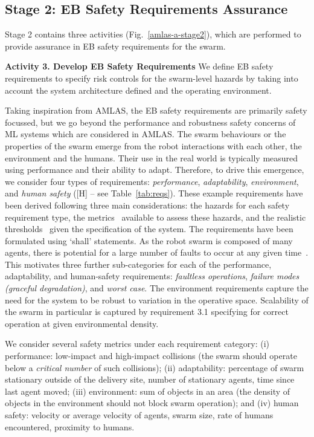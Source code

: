 \documentclass[runningheads]{llncs}
\begin{document}
	\subsection{Stage 2: EB Safety Requirements Assurance} \label{framework-stage2}
	Stage 2 contains three activities (Fig.~\ref{amlas-a-stage2}), which are performed to provide assurance in EB safety requirements for the swarm. 
	
	\noindent\textbf{Activity 3. Develop EB Safety Requirements}  
	We define EB safety requirements to specify risk controls for the swarm-level hazards by taking into account the system architecture defined and the operating environment. 
	
	Taking inspiration from AMLAS, the EB safety requirements are primarily safety focussed, but we go beyond the performance and robustness safety concerns of ML systems which are considered in AMLAS.  
	The swarm behaviours or the properties of the swarm emerge from the robot interactions with each other, the environment and the humans. Their use in the real world is typically measured using performance and their ability to adapt. Therefore, to drive this emergence, we consider four types of requirements: \emph{performance}, \emph{adaptability}, \emph{environment}, and \emph{human safety} ([H] -- see Table~\ref{tab:reqs}).
	These example requirements have been derived following three main considerations: the hazards for each safety requirement type, the metrics~\cite{Lee2022} available to assess these hazards, and the realistic thresholds~\cite{Jones2022} given the specification of the system. 
	The requirements have been formulated using `shall' statements. 
	As the robot swarm is composed of many agents, there is potential for a large number of faults to occur at any given time~\cite{Lee2022}. This motivates three further sub-categories for each of the performance, adaptability, and human-safety requirements: \emph{faultless operations}, \emph{failure modes (graceful degradation)}, and \emph{worst case}. 
	The environment requirements capture the need for the system to be robust to variation in the operative space.  
	Scalability of the swarm in particular is captured by requirement 3.1 specifying for correct operation at given environmental density.
	
	We consider several safety metrics under each requirement category: 
	(i) performance: low-impact and high-impact collisions (the swarm should operate below a \emph{critical number} of such collisions); 
	(ii) adaptability: percentage of swarm stationary outside of the delivery site, number of stationary agents, time since last agent moved; 
	(iii) environment: sum of objects in an area (the density of objects in the environment should not block swarm operation); and 
	(iv) human safety: velocity or average velocity of agents, swarm size, rate of humans encountered, proximity to humans.
	
\end{document}
